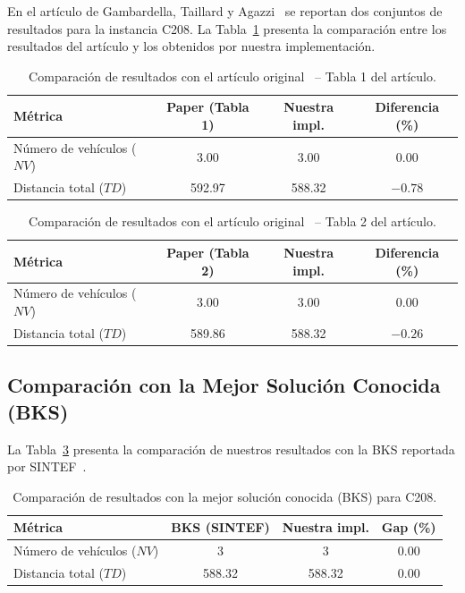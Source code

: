 \documentclass[12pt, letterpaper]{article}
\begin{document}
En el artículo de Gambardella, Taillard y Agazzi~\cite{gambardella1999} se reportan dos conjuntos de resultados para la instancia C208. La Tabla~\ref{tab:comparacion_paper} presenta la comparación entre los resultados del artículo y los obtenidos por nuestra implementación.

\begin{table}[H]
  \centering
  \caption{Comparación de resultados con el artículo original~\cite{gambardella1999} -- Tabla 1 del artículo.}
  \label{tab:comparacion_paper}
  \begin{tabular}{lccc}
    \toprule
    \textbf{Métrica} & \textbf{Paper (Tabla 1)} & \textbf{Nuestra impl.} & \textbf{Diferencia (\%)} \\
    \midrule
    Número de vehículos ($NV$) & 3.00  & 3.00 & 0.00 \\
    Distancia total ($TD$)     & 592.97 & 588.32 & $-0.78$ \\
    \bottomrule
  \end{tabular}
\end{table}

\begin{table}[H]
  \centering
  \caption{Comparación de resultados con el artículo original~\cite{gambardella1999} -- Tabla 2 del artículo.}
  \label{tab:comparacion_paper2}
  \begin{tabular}{lccc}
    \toprule
    \textbf{Métrica} & \textbf{Paper (Tabla 2)} & \textbf{Nuestra impl.} & \textbf{Diferencia (\%)} \\
    \midrule
    Número de vehículos ($NV$) & 3.00  & 3.00 & 0.00 \\
    Distancia total ($TD$)     & 589.86 & 588.32 & $-0.26$ \\
    \bottomrule
  \end{tabular}
\end{table}

\subsection{Comparación con la Mejor Solución Conocida (BKS)}
\label{subsec:comparacion_bks}

La Tabla~\ref{tab:comparacion_bks} presenta la comparación de nuestros resultados con la BKS reportada por SINTEF~\cite{sintef2024}.

\begin{table}[H]
  \centering
  \caption{Comparación de resultados con la mejor solución conocida (BKS) para C208.}
  \label{tab:comparacion_bks}
  \begin{tabular}{lccc}
    \toprule
    \textbf{Métrica} & \textbf{BKS (SINTEF)} & \textbf{Nuestra impl.} & \textbf{Gap (\%)} \\
    \midrule
    Número de vehículos ($NV$) & 3      & 3 & 0.00 \\
    Distancia total ($TD$)     & 588.32 & 588.32 & 0.00 \\
    \bottomrule
  \end{tabular}
\end{table}
\end{document}

